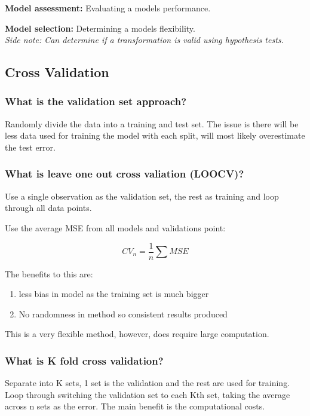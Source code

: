 \documentclass[11pt]{scrartcl} %
\begin{document}
\textbf{Model assessment:} Evaluating a models performance.

\textbf{Model selection:} Determining a models flexibility.\\

\textit{Side note: Can determine if a transformation is valid using hypothesis tests.}

\subsection{Cross Validation}

\subsubsection{What is the validation set approach?}

Randomly divide the data into a training and test set. The issue is there will be less data used
for training the model with each split, will most likely overestimate the test error.

\subsubsection{What is leave one out cross valiation (LOOCV)?}

Use a single observation as the validation set, the rest as training and loop through all data points.

Use the average MSE from all models and validations point:

\begin{equation}
	CV_n = \frac{1}{n} \sum MSE
\end{equation}

The benefits to this are:
\begin{enumerate}
	\item less bias in model as the training set is much bigger
	\item No randomness in method so consistent results produced
\end{enumerate}

This is a very flexible method, however, does require large computation.

\subsubsection{What is K fold cross validation?}

Separate into K sets, 1 set is the validation and the rest are used for training. Loop through switching
the validation set to each Kth set, taking the average across n sets as the error. 
The main benefit is the computational costs.
\end{document}
